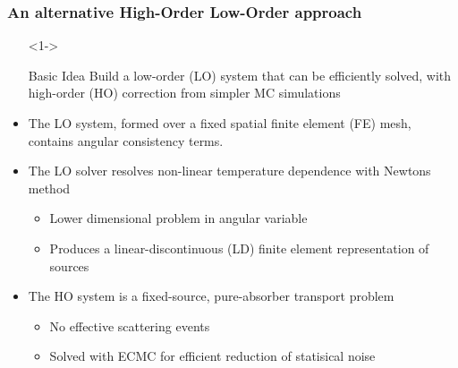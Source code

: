 \documentclass[xcolor=dvipsnames,hyperref={pdfpagelabels=false},handout,unknownkeysallowed]{beamer}
\newcommand{\colb}[1]{{\color{blue} #1}}
\newlength{\wideitemsep}
\let\olditem\item
\renewcommand{\item}{\setlength{\itemsep}{\wideitemsep}\olditem}
\begin{document}
\begin{frame}
    \frametitle{An alternative  High-Order Low-Order approach}
    {\small
        \begin{itemize}
            \item[]<1-> \begin{block}{Basic Idea} Build a low-order (LO) system that can be efficiently solved,
                with high-order (HO) correction from simpler MC simulations \end{block}
                \vspace{-0.321in}
              \item<1-> The LO system, formed over a fixed spatial finite element
                  (FE) mesh, contains \colb{angular consistency terms}.
              \item<2-> The LO solver resolves non-linear temperature dependence with
                  Newtons method
                \begin{itemize}
                    \item<2-> \colb{Lower dimensional} problem in angular variable
                    \item<2-> Produces a linear-discontinuous (LD) finite element  representation of sources
                \end{itemize}
                \vspace{-0.1in}
            \item<3-> The HO system is a fixed-source, pure-absorber transport problem
                \begin{itemize}
                    \item No effective scattering events
                    \item Solved with ECMC for efficient reduction of statisical noise 
                \end{itemize}
        \end{itemize}
    }
\end{frame}
\end{document}
